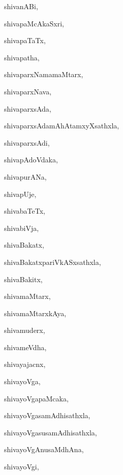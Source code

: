 \begin{multicols}{3}
{\noindent
{shivanABi}, \pageref{shivanABi}

\noindent
{shivapaMcAkaSxri}, \pageref{shivapaMcAkaSxri}

\noindent
{shivapaTaTx}, \pageref{shivapaTaTx}

\noindent
{shivapatha}, \pageref{shivapatha}

\noindent
{shivaparxNamamaMtarx}, \pageref{shivaparxNamamaMtarx}

\noindent
{shivaparxNava}, \pageref{shivaparxNava}

\noindent
{shivaparxsAda}, \pageref{shivaparxsAda}

\noindent
{shivaparxsAdamAhAtamxyXsathxla}, \pageref{shivaparxsAdamAhAtamxyXsathxla}

\noindent
{shivaparxsAdi}, \pageref{shivaparxsAdi}

\noindent
{shivapAdoVdaka}, \pageref{shivapAdoVdaka}

\noindent
{shivapurANa}, \pageref{shivapurANa}

\noindent
{shivapUje}, \pageref{shivapUje}

\noindent
{shivabaTeTx}, \pageref{shivabaTeTx}

\noindent
{shivabiVja}, \pageref{shivabiVja}

\noindent
{shivaBakatx}, \pageref{shivaBakatx}

\noindent
{shivaBakatxpariVkASxsathxla}, \pageref{shivaBakatxpariVkASxsathxla}

\noindent
{shivaBakitx}, \pageref{shivaBakitx}

\noindent
{shivamaMtarx}, \pageref{shivamaMtarx}

\noindent
{shivamaMtarxkAya}, \pageref{shivamaMtarxkAya}

\noindent
{shivamuderx}, \pageref{shivamuderx}

\noindent
{shivameVdha}, \pageref{shivameVdha}

\noindent
{shivayajacnx}, \pageref{shivayajacnx}

\noindent
{shivayoVga}, \pageref{shivayoVga}

\noindent
{shivayoVgapaMcaka}, \pageref{shivayoVgapaMcaka}

\noindent
{shivayoVgasamAdhisathxla}, \pageref{shivayoVgasamAdhisathxla}

\noindent
{shivayoVgasusamAdhisathxla}, \pageref{shivayoVgasusamAdhisathxla}

\noindent
{shivayoVgAnusaMdhAna}, \pageref{shivayoVgAnusaMdhAna}

\noindent
{shivayoVgi}, \pageref{shivayoVgi}

}
\end{multicols}
